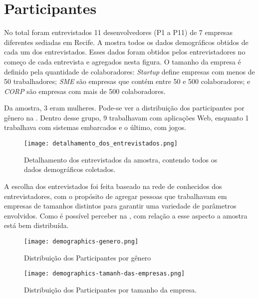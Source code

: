 \section{Participantes}

No total foram entrevistados 11 desenvolvedores (P1 a P11) de 7 empresas diferentes sediadas em Recife. A  mostra todos os dados demográficos obtidos de cada um dos entrevistados. Esses dados foram obtidos pelos entrevistadores no começo de cada entrevista e agregados nesta figura. O tamanho da empresa é definido pela quantidade de colaboradores: \emph{Startup} define empresas com menos de 50 trabalhadores; \emph{SME} são empresas que contém entre 50 e 500 colaboradores; e \emph{CORP} são empresas com mais de 500 colaboradores.


Da amostra, 3 eram mulheres. Pode-se ver a distribuição dos participantes por gênero na . Dentro desse grupo, 9 trabalhavam com aplicações Web, enquanto 1 trabalhava com sistemas embarcados e o último, com jogos.

\begin{figure}[ht]
\begin{center}
\texttt{[image: detalhamento\_dos\_entrevistados.png]}
\end{center}
\caption[Detalhamento dos entrevistados]{
    Detalhamento dos entrevistados da amostra, contendo todos os dados demográficos coletados.
}\label{detalhamento_dos_entrevistados}
\end{figure}


A escolha dos entrevistados foi feita baseado na rede de conhecidos dos entrevistadores, com o propósito de agregar pessoas que trabalhavam em empresas de tamanhos distintos para garantir uma variedade de parâmetros envolvidos. Como é possível perceber na , com relação a esse aspecto a amostra está bem distribuída. 

\begin{figure}
\centering
\begin{minipage}{.48\textwidth}
    \centering
    \texttt{[image: demographics-genero.png]}
    \caption[Distribuição dos Participantes por gênero]{
    Distribuição dos Participantes por gênero
    }\label{genero}
\end{minipage}%
\hfill
\begin{minipage}{.48\textwidth}
    \centering
    \texttt{[image: demographics-tamanh-das-empresas.png]}
    \caption[Distribuição dos Participantes por tamanho da empresa]{
    Distribuição dos Participantes por tamanho da empresa.
    }\label{tamanho_empresa}
\end{minipage}
\end{figure}

